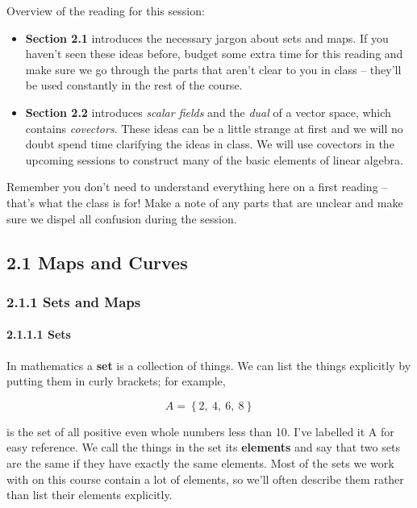 \documentclass[oneside,english]{amsbook}
\numberwithin{section}{chapter}
\theoremstyle{plain}
\theoremstyle{definition}
\begin{document}
Overview of the reading for this session:

\begin{itemize}
	\item
	\textbf{Section 2.1} introduces the necessary jargon about sets and
	maps. If you haven't seen these ideas before, budget some extra time
	for this reading and make sure we go through the parts that aren't
	clear to you in class -- they'll be used constantly in the rest of the
	course.
	\item
	\textbf{Section 2.2} introduces \emph{scalar fields} and the
	\emph{dual} of a vector space, which contains \emph{covectors}. These
	ideas can be a little strange at first and we will no doubt spend time
	clarifying the ideas in class. We will use covectors in the upcoming
	sessions to construct many of the basic elements of linear algebra.
\end{itemize}

Remember you don't need to understand everything here on a first reading
-- that's what the class is for! Make a note of any parts that are
unclear and make sure we dispel all confusion during the session.

\subsection{\texorpdfstring{2.1 Maps and Curves
	}{2.1 Maps and Curves }}\label{maps-and-curves}

\subsubsection{2.1.1 Sets and Maps}\label{sets-and-maps}

\paragraph{2.1.1.1 Sets}\label{sets}

In mathematics a \textbf{set} is a collection of things. We can list the
things explicitly by putting them in curly brackets; for example,

\[A = \left\{ 2,\ 4,\ 6,\ 8 \right\}\]

is the set of all positive even whole numbers less than 10. I've
labelled it A for easy reference. We call the things in the set its
\textbf{elements} and say that two sets are the same if they have
exactly the same elements. Most of the sets we work with on this course
contain a lot of elements, so we'll often describe them rather than list
their elements explicitly.
\end{document}
